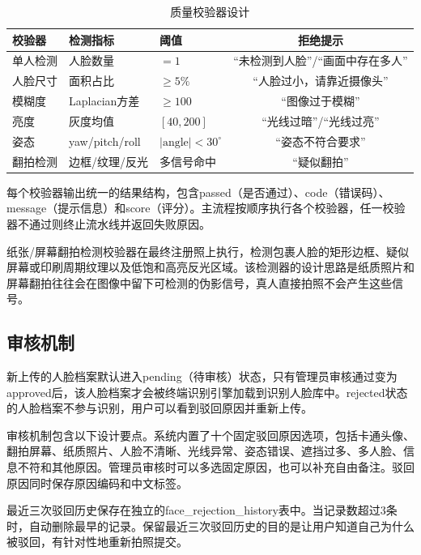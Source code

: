 \begin{table}[htbp]
    \centering
    \caption{质量校验器设计}
    \label{tab:validators}
    \begin{tabular}{lllc}
        \toprule
        \textbf{校验器} & \textbf{检测指标} & \textbf{阈值} & \textbf{拒绝提示} \\
        \midrule
        单人检测 & 人脸数量 & $=1$ & ``未检测到人脸''/``画面中存在多人'' \\
        人脸尺寸 & 面积占比 & $\geq 5\%$ & ``人脸过小，请靠近摄像头'' \\
        模糊度 & Laplacian方差 & $\geq 100$ & ``图像过于模糊'' \\
        亮度 & 灰度均值 & $[40, 200]$ & ``光线过暗''/``光线过亮'' \\
        姿态 & yaw/pitch/roll & $|\text{angle}| < 30^\circ$ & ``姿态不符合要求'' \\
        翻拍检测 & 边框/纹理/反光 & 多信号命中 & ``疑似翻拍'' \\
        \bottomrule
    \end{tabular}
\end{table}

每个校验器输出统一的结果结构，包含passed（是否通过）、code（错误码）、message（提示信息）和score（评分）。主流程按顺序执行各个校验器，任一校验器不通过则终止流水线并返回失败原因。

纸张/屏幕翻拍检测校验器在最终注册照上执行，检测包裹人脸的矩形边框、疑似屏幕或印刷周期纹理以及低饱和高亮反光区域。该检测器的设计思路是纸质照片和屏幕翻拍往往会在图像中留下可检测的伪影信号，真人直接拍照不会产生这些信号。

\subsection{审核机制}

新上传的人脸档案默认进入pending（待审核）状态，只有管理员审核通过变为approved后，该人脸档案才会被终端识别引擎加载到识别人脸库中。rejected状态的人脸档案不参与识别，用户可以看到驳回原因并重新上传。

审核机制包含以下设计要点。系统内置了十个固定驳回原因选项，包括卡通头像、翻拍屏幕、纸质照片、人脸不清晰、光线异常、姿态错误、遮挡过多、多人脸、信息不符和其他原因。管理员审核时可以多选固定原因，也可以补充自由备注。驳回原因同时保存原因编码和中文标签。

最近三次驳回历史保存在独立的face\_rejection\_history表中。当记录数超过3条时，自动删除最早的记录。保留最近三次驳回历史的目的是让用户知道自己为什么被驳回，有针对性地重新拍照提交。

